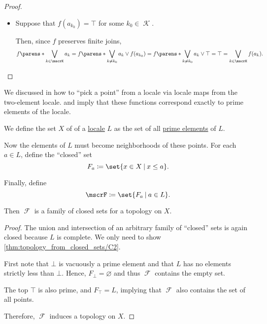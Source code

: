 \begin{proof}
\begin{itemize}
    \item Suppose that \( f(a_{k_0}) = \top \) for some \( k_0 \in \mscrK \).

    Then, since \( f \) preserves finite joins,
    \begin{equation*}
      f\parens*{ \bigvee_{k \in \mscrK} a_k }
      =
      f\parens*{ \bigvee_{k \neq k_0} a_k } \vee f(a_{k_0})
      =
      f\parens*{ \bigvee_{k \neq k_0} a_k } \vee \top
      =
      \top
      =
      \bigvee_{k \in \mscrK} f(a_k).
    \end{equation*}
  \end{itemize}
\end{proof}

\begin{remark}\label{rem:prime_elements_of_locale}
  We discussed in  how to \enquote{pick a point} from a locale via locale maps from the two-element locale.  and  imply that these functions correspond exactly to prime elements of the locale.
\end{remark}

\begin{proposition}\label{thm:locale_to_topology}
  We define the set \( X \) of  of a \hyperref[def:category_of_small_locales]{locale} \( L \) as the set of all \hyperref[def:lattice_prime_element]{prime elements} of \( L \).

  Now the elements of \( L \) must become neighborhoods of these points. For each \( a \in L \), define the \enquote{closed} set
  \begin{equation*}
    F_a \coloneqq \set{ x \in X \given x \leq a }.
  \end{equation*}

  Finally, define
  \begin{equation*}
    \mscrF \coloneqq \set{ F_a \given a \in L }.
  \end{equation*}

  Then \( \mscrF \) is a family of closed sets for a topology on \( X \).
\end{proposition}
\begin{proof}
  The union and intersection of an arbitrary family of \enquote{closed} sets is again closed because \( L \) is complete. We only need to show \ref{thm:topology_from_closed_sets/C2}.

  First note that \( \bot \) is vacuously a prime element and that \( L \) has no elements strictly less than \( \bot \). Hence, \( F_\bot = \varnothing \) and thus \( \mscrF \) contains the empty set.

  The top \( \top \) is also prime, and \( F_\top = L \), implying that \( \mscrF \) also contains the set of all points.

  Therefore, \( \mscrF \) induces a topology on \( X \).
\end{proof}
